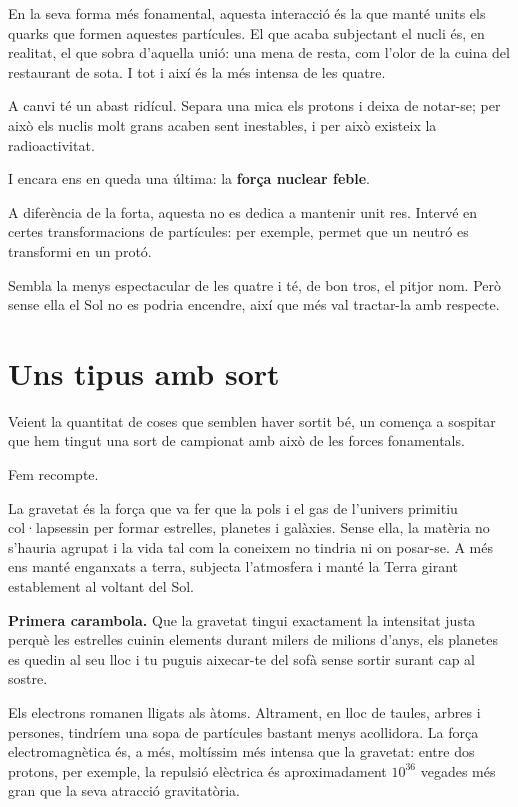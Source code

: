 En la seva forma més fonamental, aquesta interacció és la que manté units els quarks que formen aquestes partícules. El que acaba subjectant el nucli és, en realitat, el que sobra d'aquella unió: una mena de resta, com l'olor de la cuina del restaurant de sota. I tot i així és la més intensa de les quatre.

A canvi té un abast ridícul. Separa una mica els protons i deixa de notar-se; per això els nuclis molt grans acaben sent inestables, i per això existeix la radioactivitat.

I encara ens en queda una última: la \textbf{força nuclear feble}.

A diferència de la forta, aquesta no es dedica a mantenir unit res. Intervé en certes transformacions de partícules: per exemple, permet que un neutró es transformi en un protó.

Sembla la menys espectacular de les quatre i té, de bon tros, el pitjor nom. Però sense ella el Sol no es podria encendre, així que més val tractar-la amb respecte.

\section{Uns tipus amb sort}

Veient la quantitat de coses que semblen haver sortit bé, un comença a sospitar que hem tingut una sort de campionat amb això de les forces fonamentals.

Fem recompte.

La gravetat és la força que va fer que la pols i el gas de l'univers primitiu col·lapsessin per formar estrelles, planetes i galàxies. Sense ella, la matèria no s'hauria agrupat i la vida tal com la coneixem no tindria ni on posar-se. A més ens manté enganxats a terra, subjecta l'atmosfera i manté la Terra girant establement al voltant del Sol.

\textbf{Primera carambola.} Que la gravetat tingui exactament la intensitat justa perquè les estrelles cuinin elements durant milers de milions d'anys, els planetes es quedin al seu lloc i tu puguis aixecar-te del sofà sense sortir surant cap al sostre.

Els electrons romanen lligats als àtoms. Altrament, en lloc de taules, arbres i persones, tindríem una sopa de partícules bastant menys acollidora. La força electromagnètica és, a més, moltíssim més intensa que la gravetat: entre dos protons, per exemple, la repulsió elèctrica és aproximadament \(10^{36}\) vegades més gran que la seva atracció gravitatòria.


